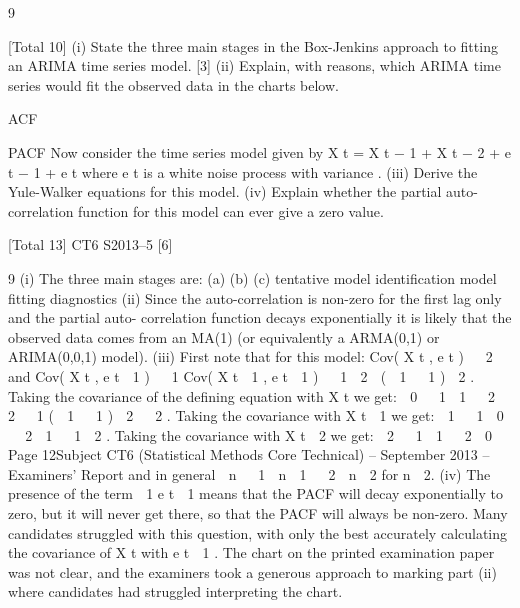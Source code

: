 9

[Total 10]
(i) State the three main stages in the Box-Jenkins approach to fitting an ARIMA
time series model.
[3]
(ii) Explain, with reasons, which ARIMA time series would fit the observed data
in the charts below.

ACF

PACF
Now consider the time series model given by
X t =  X t − 1 +  X t − 2 + e t − 1 + e t
where e t is a white noise process with variance  .
(iii) Derive the Yule-Walker equations for this model.
(iv) Explain whether the partial auto-correlation function for this model can ever
give a zero value.

[Total 13]
CT6 S2013–5
[6]

9
(i)
The three main stages are:
(a)
(b)
(c)
tentative model identification
model fitting
diagnostics
(ii) Since the auto-correlation is non-zero for the first lag only and the partial auto-
correlation function decays exponentially it is likely that the observed data
comes from an MA(1) (or equivalently a ARMA(0,1) or ARIMA(0,0,1)
model).
(iii) First note that for this model:
Cov( X t , e t )   2
and
Cov( X t , e t  1 )   1 Cov( X t  1 , e t  1 )   1  2  (  1   1 )  2 .
Taking the covariance of the defining equation with X t we get:
 0   1  1   2  2   1 (  1   1 )  2   2 .
Taking the covariance with X t  1 we get:
 1   1  0   2  1   1  2 .
Taking the covariance with X t  2 we get:
 2   1  1   2  0
Page 12Subject CT6 (Statistical Methods Core Technical) – September 2013 – Examiners’ Report
and in general
 n   1  n  1   2  n  2 for n  2.
(iv)
The presence of the term  1 e t  1 means that the PACF will decay exponentially
to zero, but it will never get there, so that the PACF will always be non-zero.
Many candidates struggled with this question, with only the best accurately calculating the
covariance of X t with e t  1 . The chart on the printed examination paper was not clear, and the
examiners took a generous approach to marking part (ii) where candidates had struggled
interpreting the chart.
